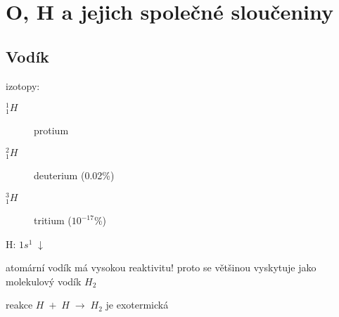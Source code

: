 \section{O, H a jejich společné sloučeniny}

\subsection{Vodík}

izotopy:
\begin{description}
    \item[$^1_1H$] protium
    \item[$^2_1H$] deuterium (0.02\%)
    \item[$^3_1H$] tritium ($10^{-17}$\%)
\end{description}

\smallskip

H: \(1s^1 \; \boxed{\downarrow\phantom{\uparrow}}\)

\bigskip

atomární vodík má vysokou reaktivitu! proto se většinou vyskytuje jako molekulový vodík $H_2$

reakce \(H \; + \; H \; \to \; H_2\) je exotermická